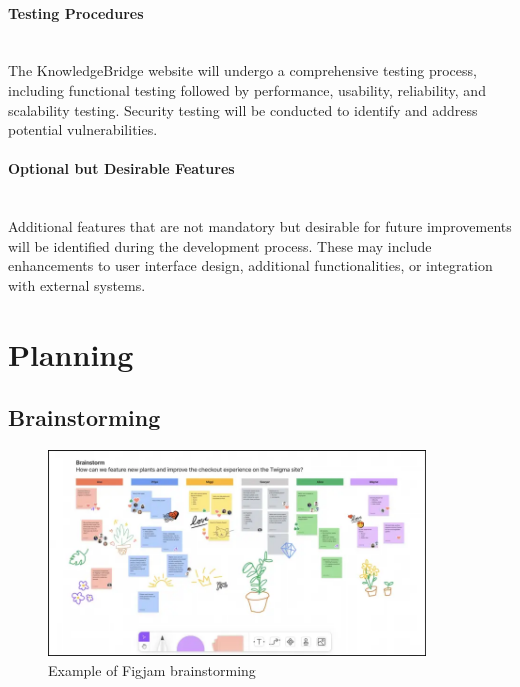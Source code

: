 \documentclass[12pt,a4paper]{article}
\begin{document}
\begin{spacing}{1.5}
    \paragraph{Testing Procedures} \mbox{} \\ \indent
    The KnowledgeBridge website will undergo a comprehensive testing process, including functional testing followed by performance, usability, reliability, and scalability testing. Security testing will be conducted to identify and address potential vulnerabilities.

    \paragraph{Optional but Desirable Features} \mbox{} \\ \indent
    Additional features that are not mandatory but desirable for future improvements will be identified during the development process. These may include enhancements to user interface design, additional functionalities, or integration with external systems.

    \newpage
    \section{Planning}
    \subsection{Brainstorming}
    \begin{figure}[h]
        \centering
        \includegraphics[width=10cm]{assets/brainstorming-example.png}
        \caption{Example of Figjam brainstorming}
        \label{fig:figjam-brainstorming}
    \end{figure}
    \FloatBarrier


\end{spacing}
\end{document}
